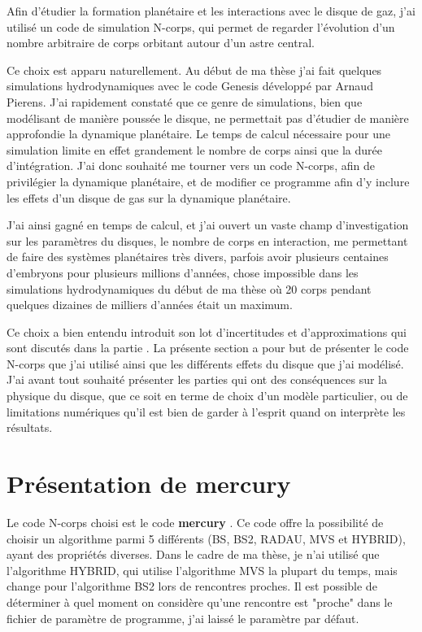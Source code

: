Afin d'étudier la formation planétaire et les interactions avec le disque de gaz, j'ai utilisé un code de simulation N-corps, qui permet de regarder l'évolution d'un nombre arbitraire de corps orbitant autour d'un astre central. 

Ce choix est apparu naturellement. Au début de ma thèse j'ai fait quelques simulations hydrodynamiques avec le code Genesis développé par Arnaud Pierens. J'ai rapidement constaté que ce genre de simulations, bien que modélisant de manière poussée le disque, ne permettait pas d'étudier de manière approfondie la dynamique planétaire. Le temps de calcul nécessaire pour une simulation limite en effet grandement le nombre de corps ainsi que la durée d'intégration. J'ai donc souhaité me tourner vers un code N-corps, afin de privilégier la dynamique planétaire, et de modifier ce programme afin d'y inclure les effets d'un disque de gas sur la dynamique planétaire. 

J'ai ainsi gagné en temps de calcul, et j'ai ouvert un vaste champ d'investigation sur les paramètres du disques, le nombre de corps en interaction, me permettant de faire des systèmes planétaires très divers, parfois avoir plusieurs centaines d'embryons pour plusieurs millions d'années, chose impossible dans les simulations hydrodynamiques du début de ma thèse où 20 corps pendant quelques dizaines de milliers d'années était un maximum. 

Ce choix a bien entendu introduit son lot d'incertitudes et d'approximations qui sont discutés dans la partie . La présente section a pour but de présenter le code N-corps que j'ai utilisé ainsi que les différents effets du disque que j'ai modélisé. J'ai avant tout souhaité présenter les parties qui ont des conséquences sur la physique du disque, que ce soit en terme de choix d'un modèle particulier, ou de limitations numériques qu'il est bien de garder à l'esprit quand on interprète les résultats.

\section{Présentation de mercury}
Le code N-corps choisi est le code \textbf{mercury} \citep{chambers1999hybrid}. Ce code offre la possibilité de choisir un algorithme parmi 5 différents (BS, BS2, RADAU, MVS et HYBRID), ayant des propriétés diverses. Dans le cadre de ma thèse, je n'ai utilisé que l'algorithme HYBRID, qui utilise l'algorithme MVS la plupart du temps, mais change pour l'algorithme BS2 lors de rencontres proches. Il est possible de déterminer à quel moment on considère qu'une rencontre est "proche" dans le fichier de paramètre de programme, j'ai laissé le paramètre par défaut. 

